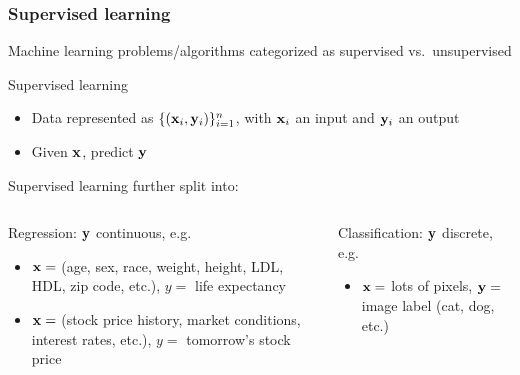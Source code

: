 \begin{frame}
    \frametitle{Supervised learning}
    Machine learning problems/algorithms categorized as \alert{supervised} vs.\ \alert{unsupervised}

    \begin{block}{Supervised learning}
        \begin{itemize}
            \item Data represented as $\{(\mathbf{x}_i, \mathbf{y}_i)\}_{i=1}^n$, with $\mathbf{x}_i$ an input and $\mathbf{y}_i$ an output
            \item Given $\mathbf{x}$, predict $\mathbf{y}$
        \end{itemize}
    \end{block}
    \pause

    Supervised learning further split into: \\[1ex]
    \begin{columns}[t]
        \begin{column}{0.47\textwidth}
            \alert{Regression}: $\mathbf{y}$ continuous, e.g.
            \begin{itemize}
                \item $\mathbf{x} =$ (age, sex, race, weight, height, LDL, HDL, zip code, etc.), $y =$ life expectancy
                \item $\mathbf{x} =$ (stock price history, market conditions, interest rates, etc.), $y =$ tomorrow's stock price
            \end{itemize}
        \end{column}
        \pause
        \begin{column}{0.45\textwidth}
            \alert{Classification}: $\mathbf{y}$ discrete, e.g.
            \begin{itemize}
                \item $\mathbf{x} =$ lots of pixels, $\mathbf{y} =$ image label (cat, dog, etc.)
            \end{itemize}
        \end{column}
    \end{columns}
\end{frame}

